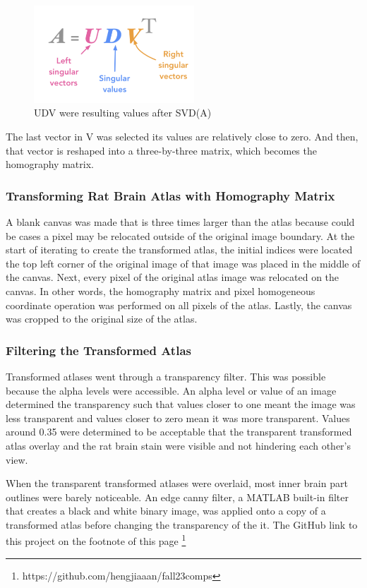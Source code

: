 \documentclass[10pt,twocolumn]{article}
\begin{document}
\begin{figure}[htp]
    \centering
    \includegraphics[width=6cm]{svd.png}
    \caption{UDV were resulting values after SVD(A)}
\end{figure}
The last vector in V was selected its values are relatively close to zero. And then, that vector is reshaped into a three-by-three matrix, which becomes the homography matrix.

\subsubsection{Transforming Rat Brain Atlas with Homography Matrix}
A blank canvas was made that is three times larger than the atlas because could be cases a pixel may be relocated outside of the original image boundary. At the start of iterating to create the transformed atlas, the initial indices were located the top left corner of the original image of that image was placed in the middle of the canvas. Next, every pixel of the original atlas image was relocated on the canvas. In other words, the homography matrix and pixel homogeneous coordinate operation was performed on all pixels of the atlas. Lastly, the canvas was cropped to the original size of the atlas.

\subsubsection{Filtering the Transformed Atlas}
Transformed atlases went through a transparency filter. This was possible because the alpha levels were accessible. An alpha level or value of an image determined the transparency such that values closer to one meant the image was less transparent and values closer to zero mean it was more transparent. Values around 0.35 were determined to be acceptable that the transparent transformed atlas overlay and the rat brain stain were visible and not hindering each other's view.

When the transparent transformed atlases were overlaid, most inner brain part outlines were barely noticeable. An edge canny filter, a MATLAB built-in filter that creates a black and white binary image, was applied onto a copy of a transformed atlas before changing the transparency of the it. The GitHub link to this project on the footnote of this page \footnote{https://github.com/hengjiaaan/fall23comps}
\end{document}
